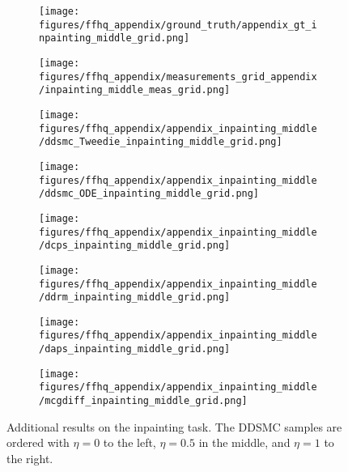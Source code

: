 \begin{figure*}[h!]
    \centering
    \begin{subfigure}[t]{0.083\linewidth}
        \centering
        \texttt{[image: figures/ffhq\_appendix/ground\_truth/appendix\_gt\_inpainting\_middle\_grid.png]}
    \end{subfigure}%
    \hfill
    \begin{subfigure}[t]{0.083\linewidth}
        \centering
        \texttt{[image: figures/ffhq\_appendix/measurements\_grid\_appendix/inpainting\_middle\_meas\_grid.png]}
    \end{subfigure}%
    \hfill
    \begin{subfigure}[t]{0.25\linewidth}
        \centering
        \texttt{[image: figures/ffhq\_appendix/appendix\_inpainting\_middle/ddsmc\_Tweedie\_inpainting\_middle\_grid.png]}
    \end{subfigure}%
    \hfill
    \begin{subfigure}[t]{0.25\linewidth}
        \centering
        \texttt{[image: figures/ffhq\_appendix/appendix\_inpainting\_middle/ddsmc\_ODE\_inpainting\_middle\_grid.png]}
    \end{subfigure}%
    \hfill
    \begin{subfigure}[t]{0.083\linewidth}
        \centering
        \texttt{[image: figures/ffhq\_appendix/appendix\_inpainting\_middle/dcps\_inpainting\_middle\_grid.png]}
    \end{subfigure}%
    \begin{subfigure}[t]{0.083\linewidth}
        \centering
        \texttt{[image: figures/ffhq\_appendix/appendix\_inpainting\_middle/ddrm\_inpainting\_middle\_grid.png]}
    \end{subfigure}%
    \begin{subfigure}[t]{0.083\linewidth}
        \centering
        \texttt{[image: figures/ffhq\_appendix/appendix\_inpainting\_middle/daps\_inpainting\_middle\_grid.png]}
    \end{subfigure}%
    \begin{subfigure}[t]{0.083\linewidth}
        \centering
        \texttt{[image: figures/ffhq\_appendix/appendix\_inpainting\_middle/mcgdiff\_inpainting\_middle\_grid.png]}
    \end{subfigure}%
\caption{Additional results on the inpainting task. The DDSMC samples are ordered with $\eta=0$ to the left, $\eta=0.5$ in the middle, and $\eta=1$ to the right. }
\label{fig:ffhq_appendix_inpainting_middle}
\end{figure*}
